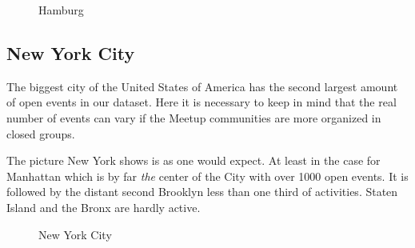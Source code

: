 \begin{figure}[!htp]
	\hfill
	\caption{Hamburg}
\end{figure}

\subsection*{New York City}

The biggest city of the United States of America has the second largest amount of open events in our dataset. Here it is necessary to keep in mind that the real number of events can vary if the Meetup communities are more organized in closed groups. 

The picture New York shows is as one would expect. At least in the case for Manhattan which is by far \emph{the} center of the City with over 1000 open events. It is followed by the distant second Brooklyn less than one third of activities. Staten Island and the Bronx are hardly active. 

\begin{figure}[!htp]
	\hfill
	\caption{New York City}\label{fig:newyorkmap}
\end{figure}

